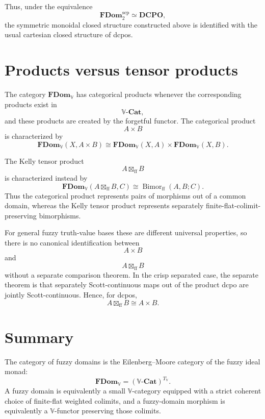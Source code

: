 Thus, under the equivalence
\[
    \mathbf{FDom}_{2}^{\mathrm{sep}}
    \simeq
    \mathbf{DCPO},
\]
the symmetric monoidal closed structure constructed above is identified with the
usual cartesian closed structure of dcpos.

\section{Products versus tensor products}
\label{sec:products-versus-tensors-fdom-rewrite}

The category \(\mathbf{FDom}_{\mathbb V}\) has categorical products whenever the
corresponding products exist in
\[
    \mathbb V\text{-}\mathbf{Cat},
\]
and these products are created by the forgetful functor.  The categorical
product
\[
    A\times B
\]
is characterized by
\[
    \mathbf{FDom}_{\mathbb V}(X,A\times B)
    \cong
    \mathbf{FDom}_{\mathbb V}(X,A)
    \times
    \mathbf{FDom}_{\mathbb V}(X,B).
\]

The Kelly tensor product
\[
    A\boxtimes_{\mathrm{ff}}B
\]
is characterized instead by
\[
    \mathbf{FDom}_{\mathbb V}(A\boxtimes_{\mathrm{ff}}B,C)
    \cong
    \operatorname{Bimor}_{\mathrm{ff}}(A,B;C).
\]
Thus the categorical product represents pairs of morphisms out of a common
domain, whereas the Kelly tensor product represents separately
finite-flat-colimit-preserving bimorphisms.

For general fuzzy truth-value bases these are different universal properties, so
there is no canonical identification between
\[
    A\times B
\]
and
\[
    A\boxtimes_{\mathrm{ff}}B
\]
without a separate comparison theorem.  In the crisp separated case, the
separate theorem is that separately Scott-continuous maps out of the product
dcpo are jointly Scott-continuous.  Hence, for dcpos,
\[
    A\boxtimes_{\mathrm{ff}}B
    \cong
    A\times B.
\]

\section{Summary}
\label{sec:summary-fdom-rewrite}

The category of fuzzy domains is the Eilenberg--Moore category of the fuzzy ideal
monad:
\[
    \mathbf{FDom}_{\mathbb V}
    =
    (\mathbb V\text{-}\mathbf{Cat})^{T_{\mathbb V}}.
\]
A fuzzy domain is equivalently a small \(\mathbb V\)-category equipped with a
strict coherent choice of finite-flat weighted colimits, and a fuzzy-domain
morphism is equivalently a \(\mathbb V\)-functor preserving those colimits.

